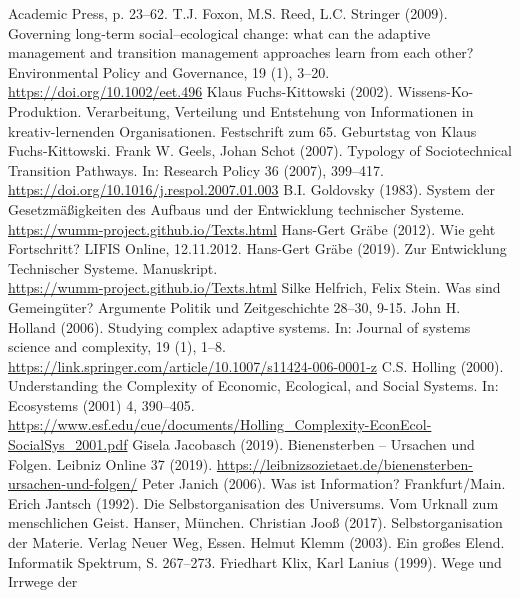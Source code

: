 \documentclass[11pt,a4paper]{article}
\begin{document}
\begin{thebibliography}{xxx}
  Academic Press, p. 23--62.
 T.J. Foxon, M.S. Reed, L.C. Stringer (2009). Governing
  long‐term social–ecological change: what can the adaptive management and
  transition management approaches learn from each other? Environmental Policy
  and Governance, 19 (1), 3--20.\\ \url{https://doi.org/10.1002/eet.496}
 Klaus Fuchs-Kittowski (2002). Wissens-Ko-Produktion.
  Verarbeitung, Verteilung und Entstehung von Informationen in
  kreativ-lernenden Organisationen.  Festschrift zum 65. Geburtstag von Klaus
  Fuchs-Kittowski.
 Frank W. Geels, Johan Schot (2007). Typology of
  Sociotechnical Transition Pathways. In: Research Policy 36 (2007),
  399–417.\\ \url{https://doi.org/10.1016/j.respol.2007.01.003}
 B.I. Goldovsky (1983). System der Gesetzmäßigkeiten
  des Aufbaus und der Entwicklung technischer Systeme.
  \url{https://wumm-project.github.io/Texts.html}
 Hans-Gert Gräbe (2012). Wie geht Fortschritt? LIFIS
  Online, 12.11.2012.
 Hans-Gert Gräbe (2019). Zur Entwicklung Technischer
  Systeme.  Manuskript. \\ \url{https://wumm-project.github.io/Texts.html}
 Silke Helfrich, Felix Stein. Was sind Gemeingüter?
  Argumente Politik und Zeitgeschichte 28--30, 9-15.
 John H. Holland (2006). Studying complex adaptive
  systems. In: Journal of systems science and complexity, 19 (1),
  1–8.\\ \url{https://link.springer.com/article/10.1007/s11424-006-0001-z}
 C.S. Holling (2000). Understanding the Complexity of
  Economic, Ecological, and Social Systems. In: Ecosystems (2001) 4, 390–405.
  \url{https://www.esf.edu/cue/documents/Holling_Complexity-EconEcol-SocialSys_2001.pdf}
 Gisela Jacobasch (2019). Bienensterben -- Ursachen und
  Folgen.  Leibniz Online 37 (2019).
  \url{https://leibnizsozietaet.de/bienensterben-ursachen-und-folgen/}
 Peter Janich (2006). Was ist Information?
  Frankfurt/Main.
 Erich Jantsch (1992). Die Selbstorganisation des
  Universums. Vom Urknall zum menschlichen Geist.  Hanser, München.
 Christian Jooß (2017). Selbstorganisation der Materie.
  Verlag Neuer Weg, Essen.
 Helmut Klemm (2003). Ein großes Elend. Informatik
  Spektrum, S. 267--273.
 Friedhart Klix, Karl Lanius (1999). Wege und Irrwege der

\end{thebibliography}
\end{document}
